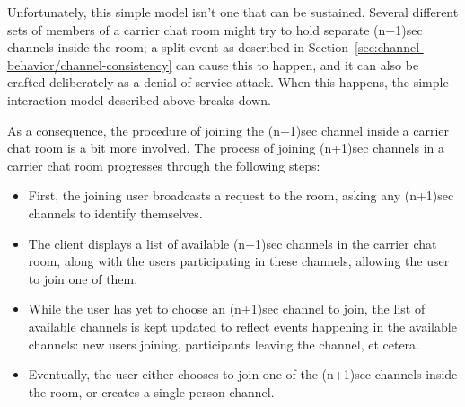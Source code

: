 \documentclass{article}
\begin{document}
Unfortunately, this simple model isn't one that can be sustained.
Several different sets of members of a carrier chat room might try to hold separate (n+1)sec channels inside the room; a split event as described in Section~\ref{sec:channel-behavior/channel-consistency} can cause this to happen, and it can also be crafted deliberately as a denial of service attack.
When this happens, the simple interaction model described above breaks down.

As a consequence, the procedure of joining the (n+1)sec channel inside a carrier chat room is a bit more involved.
The process of joining (n+1)sec channels in a carrier chat room progresses through the following steps:
\begin{itemize}
\item First, the joining user broadcasts a request to the room, asking any (n+1)sec channels to identify themselves.
\item The client displays a list of available (n+1)sec channels in the carrier chat room, along with the users participating in these channels, allowing the user to join one of them.
\item While the user has yet to choose an (n+1)sec channel to join, the list of available channels is kept updated to reflect events happening in the available channels: new users joining, participants leaving the channel, et cetera.
\item Eventually, the user either chooses to join one of the (n+1)sec channels inside the room, or creates a single-person channel.
\end{itemize}
\end{document}
